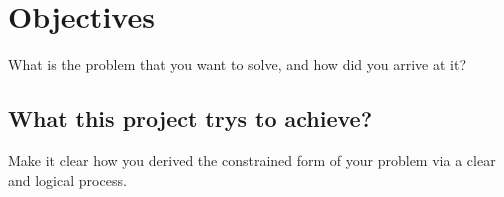 \chapter{Objectives}
What is the problem that you want to solve, and how did you arrive at it?
\section{What this project trys to achieve?}
Make it clear how you derived the constrained form of your problem via a clear and logical process. 